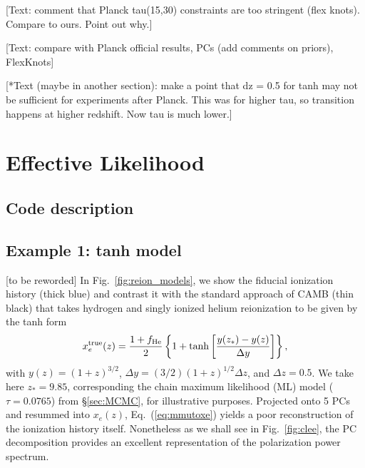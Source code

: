 \documentclass[prd,twocolumn,amsmath,amssymb,floatfix,superscriptaddress,nofootinbib]{revtex4-1}
\begin{document}
[Text: comment that Planck tau(15,30) constraints are too stringent (flex knots). Compare to ours. Point out why.]

[Text: compare with Planck official results, PCs (add comments on priors), FlexKnots]

[*Text (maybe in another section): make a point that dz = 0.5 for tanh may not be sufficient for experiments after Planck. This was for higher tau, so transition happens at higher redshift. Now tau is much lower.]


\section{Effective Likelihood}
\label{sec:effective_likelihood}

\subsection{Code description}
\label{sec:code}

\subsection{Example 1: tanh model}
\label{sec:example1}

[to be reworded]
In Fig.~\ref{fig:reion_models}, we show the fiducial ionization history (thick blue) and contrast it with
the standard approach of CAMB (thin black) that takes hydrogen and singly ionized helium reionization to be given by
the tanh form
 \begin{equation}
x_e^{\rm true}(z) = \frac{1+f_{\rm He}}{2}\left\{  1+ \tanh\left[ \frac{y(z_*)-y(z)}{\Delta y} \right] \right\},
 \label{eqn:tanh}
 \end{equation}
 with $y(z)=(1+z)^{3/2}$, $\Delta y=(3/2)(1+z)^{1/2}\Delta z$, and $\Delta z = 0.5$.  We take here $z_*= 9.85$, corresponding the chain maximum likelihood (ML) model ($\tau = 0.0765$) from \S \ref{sec:MCMC},  for illustrative purposes.   Projected onto 5 PCs and resummed into $x_e(z)$, Eq.~(\ref{eq:mmutoxe}) yields a poor reconstruction of the ionization history itself.
 Nonetheless as we shall see in Fig.~\ref{fig:clee}, the PC decomposition provides an 
 excellent representation of the polarization power spectrum.
 
\end{document}
